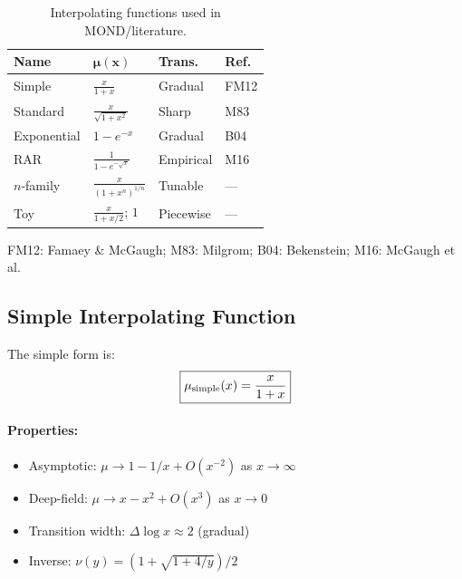 \begin{table}[h!]
\centering
\caption{Interpolating functions used in MOND/\DFD literature.}
\label{tab:mu_catalog-full}
\begin{ruledtabular}
\scriptsize
\begin{tabular}{llll}
\textbf{Name} & $\boldsymbol{\mu(x)}$ & \textbf{Trans.} & \textbf{Ref.} \\
\hline
Simple & $\frac{x}{1+x}$ & Gradual & FM12 \\[1mm]
Standard & $\frac{x}{\sqrt{1+x^2}}$ & Sharp & M83 \\[1mm]
Exponential & $1 - e^{-x}$ & Gradual & B04 \\[1mm]
RAR & $\frac{1}{1 - e^{-\sqrt{x}}}$ & Empirical & M16 \\[1mm]
$n$-family & $\frac{x}{(1+x^n)^{1/n}}$ & Tunable & --- \\[1mm]
Toy & $\frac{x}{1+x/2}$; $1$ & Piecewise & --- \\
\end{tabular}
\end{ruledtabular}
\vspace{1mm}
{\scriptsize FM12: Famaey \& McGaugh; M83: Milgrom; B04: Bekenstein; M16: McGaugh et al.}
\end{table}

\subsection{Simple Interpolating Function}\label{app:mu_simple}

The simple form is:
\begin{equation}
\boxed{\mu_{\rm simple}(x) = \frac{x}{1+x}}
\end{equation}

\paragraph{Properties:}
\begin{itemize}
\item Asymptotic: $\mu \to 1 - 1/x + O(x^{-2})$ as $x \to \infty$
\item Deep-field: $\mu \to x - x^2 + O(x^3)$ as $x \to 0$
\item Transition width: $\Delta \log x \approx 2$ (gradual)
\item Inverse: $\nu(y) = (1 + \sqrt{1 + 4/y})/2$
\end{itemize}

